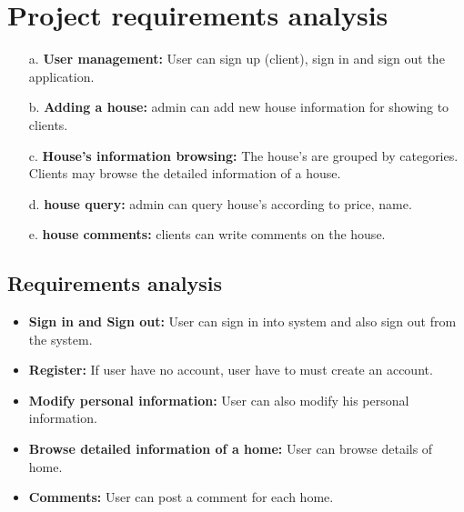 \documentclass[12pt,a4paper]{report}
\newcommand\tab[1][0cm]{\hspace*{#1}}
\begin{document}
		\section{Project requirements analysis}
		\tab{Project requirements analysis are important stage in the system development. It
	determines the functions of the whole application integrity and stability. Software requirements
	analysis is an ongoing process of understanding and progressive refinement. Through
	requirements analysis, design functions of the management system as below-}
				\begin{itemize}
					\item[a.]\textbf{User management:} User can sign up (client), sign in and sign out the application.
					\item[b.]\textbf{Adding a house:} admin can add new house information for showing to clients.
					\item[c.]\textbf{House's information browsing:} The house's are grouped by categories. Clients may
	browse the detailed information of a house.
					\item[d.]\textbf{house query:} admin can query house's according to price, name.
					\item[e.]\textbf{house comments:} clients can write comments on the house.
				\end{itemize}
			\subsection{Requirements analysis}
			\tab{The in-front management system is the user visits home list and
	sign up user as client. Only the admin can manage his/her searching potion about the
	specific home, comment and price. So in this part, specific functions are described as
	below:}	\begin{itemize}
					\item {\bfseries Sign in and Sign out:} User can sign in into system and also sign out from the system.
					\item {\bfseries Register:} If user have no account, user have to must create an account.
					\item {\bfseries Modify personal information:} User can also modify his personal information.
					\item {\bfseries Browse detailed information of a home:} User can browse details of home.
					\item {\bfseries Comments:} User can post a comment for each home.
				\end{itemize}
\end{document}
